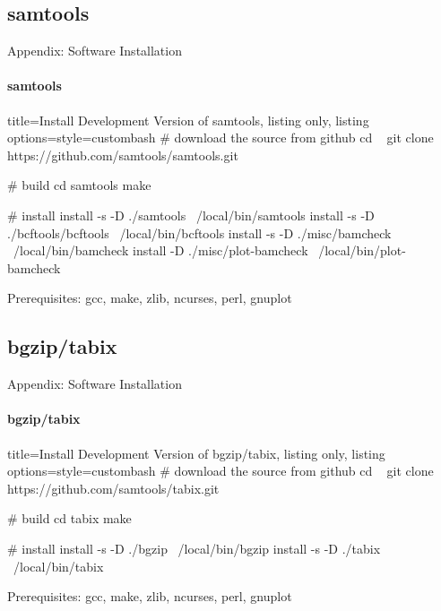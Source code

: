 \documentclass{beamer}
\begin{document}
\subsection*{samtools}
\begin{frame}[fragile]{Appendix: Software Installation}
\framesubtitle{samtools}
\begin{tcblisting}{title={Install Development Version of samtools}, listing only, listing options={style=custombash}}
# download the source from github
cd ~
git clone https://github.com/samtools/samtools.git

# build 
cd samtools
make

# install
install -s -D ./samtools ~/local/bin/samtools
install -s -D ./bcftools/bcftools ~/local/bin/bcftools
install -s -D ./misc/bamcheck ~/local/bin/bamcheck
install -D ./misc/plot-bamcheck ~/local/bin/plot-bamcheck
\end{tcblisting}

Prerequisites: 
gcc,
make,
zlib, 
ncurses, 
perl, %
gnuplot %

\end{frame}



\subsection*{bgzip/tabix}
\begin{frame}[fragile]{Appendix: Software Installation}
\framesubtitle{bgzip/tabix}
\begin{tcblisting}{title={Install Development Version of bgzip/tabix}, listing only, listing options={style=custombash}}
# download the source from github
cd ~
git clone https://github.com/samtools/tabix.git

# build 
cd tabix
make

# install
install -s -D ./bgzip ~/local/bin/bgzip
install -s -D ./tabix ~/local/bin/tabix
\end{tcblisting}

Prerequisites: 
gcc,
make,
zlib, 
ncurses, 
perl, %
gnuplot %

\end{frame}
\end{document}
